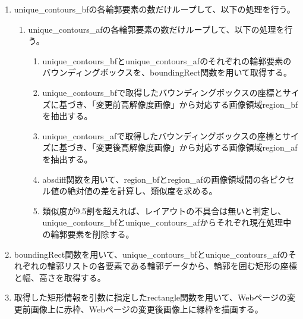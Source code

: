 \begin{enumerate}
    \item unique\_contours\_bfの各輪郭要素の数だけループして、以下の処理を行う。
          \begin{enumerate}
              \item unique\_contours\_afの各輪郭要素の数だけループして、以下の処理を行う。
                    \begin{enumerate}
                        \item unique\_contours\_bfとunique\_contours\_afのそれぞれの輪郭要素のバウンディングボックスを、boundingRect関数を用いて取得する。
                        \item unique\_contours\_bfで取得したバウンディングボックスの座標とサイズに基づき、「変更前高解像度画像」から対応する画像領域region\_bfを抽出する。
                        \item unique\_contours\_afで取得したバウンディングボックスの座標とサイズに基づき、「変更後高解像度画像」から対応する画像領域region\_afを抽出する。
                        \item absdiff関数を用いて、region\_bfとregion\_afの画像領域間の各ピクセル値の絶対値の差を計算し、類似度を求める。
                        \item 類似度が9.5割を超えれば、レイアウトの不具合は無いと判定し、unique\_contours\_bfとunique\_contours\_afからそれぞれ現在処理中の輪郭要素を削除する。
                    \end{enumerate}
          \end{enumerate}
    \item boundingRect関数を用いて、unique\_contours\_bfとunique\_contours\_afのそれぞれの輪郭リストの各要素である輪郭データから、輪郭を囲む矩形の座標と幅、高さを取得する。
    \item 取得した矩形情報を引数に指定したrectangle関数を用いて、Webページの変更前画像上に赤枠、Webページの変更後画像上に緑枠を描画する。
\end{enumerate}


